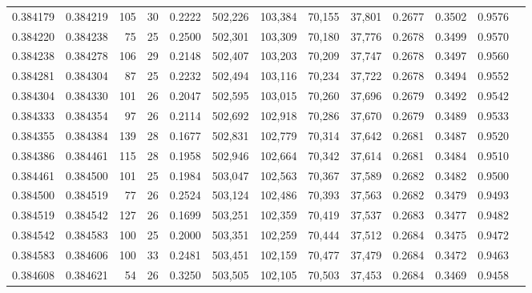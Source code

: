 \begin{tabular}{rrrrrrrrrrrrr}
0.384179 & 0.384219 &   105 &  30 &                                     0.2222 & 502,226 & 103,384 &  70,155 &  37,801 & 0.2677 & 0.3502 & 0.9576 \\
0.384220 & 0.384238 &    75 &  25 &                                     0.2500 & 502,301 & 103,309 &  70,180 &  37,776 & 0.2678 & 0.3499 & 0.9570 \\
0.384238 & 0.384278 &   106 &  29 &                                     0.2148 & 502,407 & 103,203 &  70,209 &  37,747 & 0.2678 & 0.3497 & 0.9560 \\
0.384281 & 0.384304 &    87 &  25 &                                     0.2232 & 502,494 & 103,116 &  70,234 &  37,722 & 0.2678 & 0.3494 & 0.9552 \\
0.384304 & 0.384330 &   101 &  26 &                                     0.2047 & 502,595 & 103,015 &  70,260 &  37,696 & 0.2679 & 0.3492 & 0.9542 \\
0.384333 & 0.384354 &    97 &  26 &                                     0.2114 & 502,692 & 102,918 &  70,286 &  37,670 & 0.2679 & 0.3489 & 0.9533 \\
0.384355 & 0.384384 &   139 &  28 &                                     0.1677 & 502,831 & 102,779 &  70,314 &  37,642 & 0.2681 & 0.3487 & 0.9520 \\
0.384386 & 0.384461 &   115 &  28 &                                     0.1958 & 502,946 & 102,664 &  70,342 &  37,614 & 0.2681 & 0.3484 & 0.9510 \\
0.384461 & 0.384500 &   101 &  25 &                                     0.1984 & 503,047 & 102,563 &  70,367 &  37,589 & 0.2682 & 0.3482 & 0.9500 \\
0.384500 & 0.384519 &    77 &  26 &                                     0.2524 & 503,124 & 102,486 &  70,393 &  37,563 & 0.2682 & 0.3479 & 0.9493 \\
0.384519 & 0.384542 &   127 &  26 &                                     0.1699 & 503,251 & 102,359 &  70,419 &  37,537 & 0.2683 & 0.3477 & 0.9482 \\
0.384542 & 0.384583 &   100 &  25 &                                     0.2000 & 503,351 & 102,259 &  70,444 &  37,512 & 0.2684 & 0.3475 & 0.9472 \\
0.384583 & 0.384606 &   100 &  33 &                                     0.2481 & 503,451 & 102,159 &  70,477 &  37,479 & 0.2684 & 0.3472 & 0.9463 \\
0.384608 & 0.384621 &    54 &  26 &                                     0.3250 & 503,505 & 102,105 &  70,503 &  37,453 & 0.2684 & 0.3469 & 0.9458 \\

\end{tabular}
